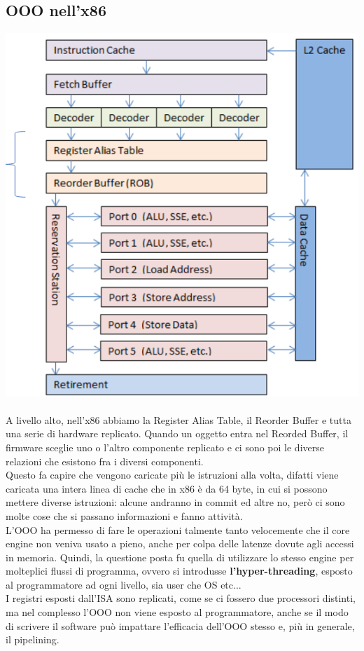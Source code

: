 \documentclass[14pt, oneside]{book}
\begin{document}
\subsection{OOO nell'x86}
\includegraphics[scale=0.3]{immagini/x86-ooo}\\\\
A livello alto, nell'x86 abbiamo la Register Alias Table, il Reorder Buffer e tutta una serie di hardware replicato. Quando un oggetto entra nel Reorded Buffer, il firmware sceglie uno o l'altro componente replicato e ci sono poi le diverse relazioni che esistono fra i diversi componenti.\\ Questo fa capire che vengono caricate più le istruzioni alla volta, difatti viene caricata una intera linea di cache che in x86 è da 64 byte, in cui si possono mettere diverse istruzioni: alcune andranno in commit ed altre no, però ci sono molte cose che si passano informazioni e fanno attività.\\ L'OOO ha permesso di fare le operazioni talmente tanto velocemente che il core engine non veniva usato a pieno, anche per colpa delle latenze dovute agli accessi in memoria. Quindi, la questione posta fu quella di utilizzare lo stesso engine per molteplici flussi di programma, ovvero si introdusse \textbf{l'hyper-threading}, esposto al programmatore ad ogni livello, sia user che OS etc...\\ I registri esposti dall'ISA sono replicati, come se ci fossero due processori distinti, ma nel complesso l'OOO non viene esposto al programmatore, anche se il modo di scrivere il software può impattare l'efficacia dell'OOO stesso e, più in generale, il pipelining.
\end{document}
